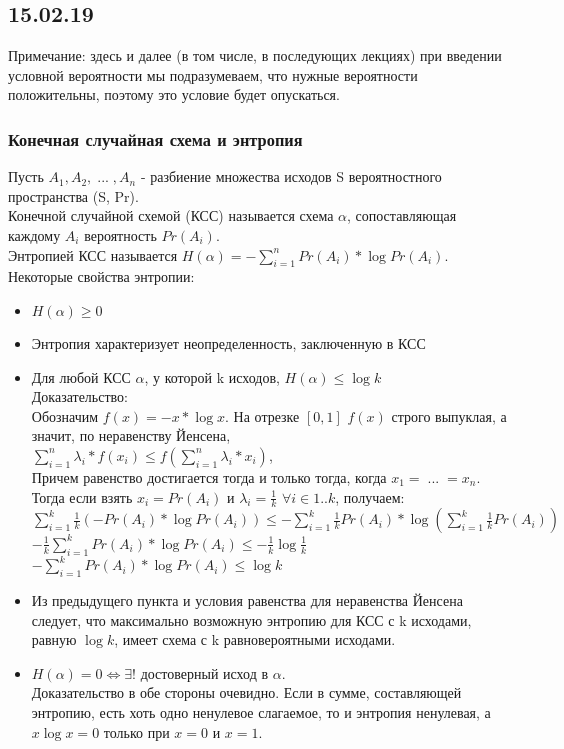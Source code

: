 \subsection{15.02.19}
Примечание: здесь и далее (в том числе, в последующих лекциях) при введении условной вероятности мы подразумеваем, что нужные вероятности положительны, поэтому это условие будет опускаться.
\subsubsection{Конечная случайная схема и энтропия}
Пусть $A_1, A_2, \; ... \; , A_n$ - разбиение множества исходов S вероятностного пространства (S, Pr). \\
Конечной случайной схемой (КСС) называется схема $\alpha$, сопоставляющая каждому $A_i$ вероятность $Pr(A_i)$.\\
Энтропией КСС называется $H(\alpha) = -\sum\limits_{i = 1}^n Pr(A_i) * \log Pr(A_i)$.\\
Некоторые свойства энтропии:\\
\begin{itemize}
\item $H(\alpha) \geq 0$\\
\item Энтропия характеризует неопределенность, заключенную в КСС\\
\item Для любой КСС $\alpha$, у которой k исходов, $H(\alpha) \leq \log k$\\
Доказательство:\\
Обозначим $f(x) = -x * \log x$. На отрезке $[0, 1]$ $f(x)$ строго выпуклая, а значит, по неравенству Йенсена,\\
$\sum\limits_{i = 1}^n \lambda_i * f(x_i) \leq f(\sum\limits_{i = 1}^n \lambda_i * x_i)$, \\
Причем равенство достигается тогда и только тогда, когда $x_1 = \; ... \; = x_n$.\\
Тогда если взять $x_i = Pr(A_i)$ и $\lambda_i = \frac{1}{k}$ $\forall i \in 1..k$, получаем:\\
$\sum\limits_{i = 1}^k \frac{1}{k}(-Pr(A_i) * \log Pr(A_i)) \leq -\sum\limits_{i = 1}^k \frac{1}{k}Pr(A_i) * \log (\sum\limits_{i = 1}^k \frac{1}{k}Pr(A_i))$\\
$-\frac{1}{k} \sum\limits_{i = 1}^k Pr(A_i) * \log Pr(A_i) \leq -\frac{1}{k} \log\frac{1}{k}$\\
$-\sum\limits_{i = 1}^k Pr(A_i) * \log Pr(A_i) \leq \log k$\\
\item Из предыдущего пункта и условия равенства для неравенства Йенсена следует, что максимально возможную энтропию для КСС с k исходами, равную $\log k$, имеет схема с k равновероятными исходами.\\
\item $H(\alpha) = 0 \Leftrightarrow \exists!$ достоверный исход в $\alpha$. \\
Доказательство в обе стороны очевидно. Если в сумме, составляющей энтропию, есть хоть одно ненулевое слагаемое, то и энтропия ненулевая, а $x \log x = 0$ только при $x = 0$ и $x = 1$.
\end{itemize}
